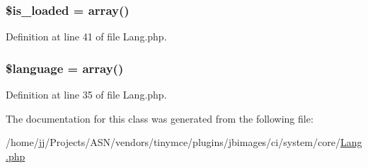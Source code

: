 \subsubsection[{\texorpdfstring{\$is\+\_\+loaded}{$is_loaded}}]{\setlength{\rightskip}{0pt plus 5cm}\$is\+\_\+loaded = array()}\hypertarget{class_c_i___lang_a908e9ad52a5d1956d360689452f6bdbe}{}\label{class_c_i___lang_a908e9ad52a5d1956d360689452f6bdbe}


Definition at line 41 of file Lang.\+php.

\subsubsection[{\texorpdfstring{\$language}{$language}}]{\setlength{\rightskip}{0pt plus 5cm}\$language = array()}\hypertarget{class_c_i___lang_a83170d318260a5a2e2a79dccdd371b10}{}\label{class_c_i___lang_a83170d318260a5a2e2a79dccdd371b10}


Definition at line 35 of file Lang.\+php.



The documentation for this class was generated from the following file\+:\begin{DoxyCompactItemize}
\item 
/home/jj/\+Projects/\+A\+S\+N/vendors/tinymce/plugins/jbimages/ci/system/core/\hyperlink{_lang_8php}{Lang.\+php}\end{DoxyCompactItemize}
